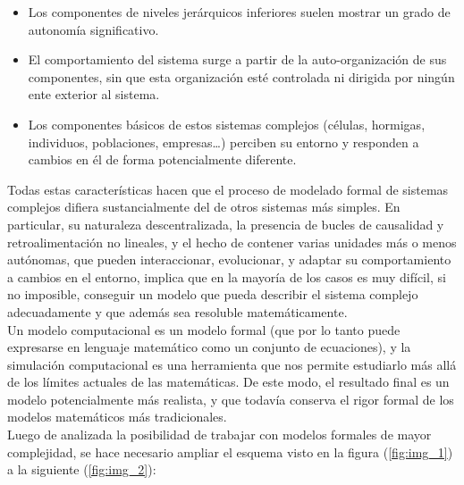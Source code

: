 \begin{itemize}
	\item Los componentes de niveles jerárquicos inferiores suelen mostrar un grado de autonomía significativo.
	\item El comportamiento del sistema surge a partir de la auto-organización de sus componentes, sin que esta organización esté controlada ni dirigida por ningún ente exterior al sistema.
	\item Los componentes básicos de estos sistemas complejos (células, hormigas, individuos, poblaciones, empresas…) perciben su entorno y responden a cambios en él de forma potencialmente diferente.
\end{itemize}

Todas estas características hacen que el proceso de modelado formal de sistemas complejos difiera sustancialmente del de otros sistemas más simples. En particular, su naturaleza descentralizada, la presencia de bucles de causalidad y retroalimentación no lineales, y el hecho de contener varias unidades más o menos autónomas, que pueden interaccionar, evolucionar, y adaptar su comportamiento a cambios en el entorno, implica que en la mayoría de los casos es muy difícil, si no imposible, conseguir un modelo que pueda describir el sistema complejo adecuadamente y que además sea resoluble matemáticamente. \parencite{izquierdo2008modelado}\\

Un modelo computacional es un modelo formal (que por lo tanto puede expresarse en lenguaje matemático como un conjunto de ecuaciones), y la simulación computacional es una herramienta que nos permite estudiarlo más allá de los límites actuales de las matemáticas. De este modo, el resultado final es un modelo potencialmente más realista, y que todavía conserva el rigor formal de los modelos matemáticos más tradicionales. \parencite{izquierdo2008modelado}\\

Luego de analizada la posibilidad de trabajar con modelos formales de mayor complejidad, se hace necesario ampliar el esquema visto en la figura (\ref{fig:img_1}) a la siguiente (\ref{fig:img_2}):

